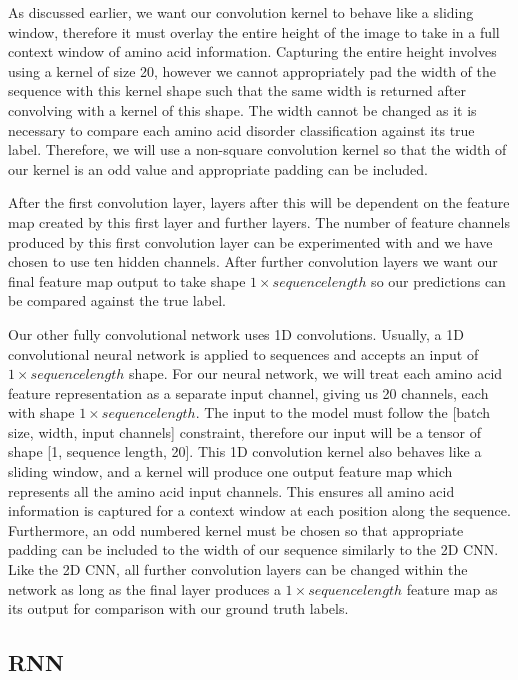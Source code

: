 \documentclass{l4proj}
\begin{document}
As discussed earlier, we want our convolution kernel to behave like a sliding window, therefore it must overlay the entire height of the image to take in a full context window of amino acid information. Capturing the entire height involves using a kernel of size 20, however we cannot appropriately pad the width of the sequence with this kernel shape such that the same width is returned after convolving with a kernel of this shape. The width cannot be changed as it is necessary to compare each amino acid disorder classification against its true label. Therefore, we will use a non-square convolution kernel so that the width of our kernel is an odd value and appropriate padding can be included. 

After the first convolution layer, layers after this will be dependent on the feature map created by this first layer and further layers. The number of feature channels produced by this first convolution layer can be experimented with and we have chosen to use ten hidden channels. After further convolution layers we want our final feature map output to take shape $1\times sequence length$ so our predictions can be compared against the true label. 

Our other fully convolutional network uses 1D convolutions. Usually, a 1D convolutional neural network is applied to sequences and accepts an input of $1\times sequence length$ shape. For our neural network, we will treat each amino acid feature representation as a separate input channel, giving us 20 channels, each with shape $1\times sequence length$. The input to the model must follow the [batch size, width, input channels] constraint, therefore our input will be a tensor of shape [1, sequence length, 20]. This 1D convolution kernel also behaves like a sliding window, and a kernel will produce one output feature map which represents all the amino acid input channels. This ensures all amino acid information is captured for a context window at each position along the sequence. Furthermore, an odd numbered kernel must be chosen so that appropriate padding can be included to the width of our sequence similarly to the 2D CNN. Like the 2D CNN, all further convolution layers can be changed within the network as long as the final layer produces a $1\times sequence length$ feature map as its output for comparison with our ground truth labels.

\subsection{RNN}
\end{document}
